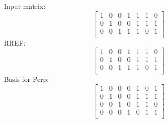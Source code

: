 \noindent Input matrix:
$$
\left[
\begin{array}{*{7}{c}}
1 & 0 & 0 & 1 & 1 & 1 & 0\\
0 & 1 & 0 & 0 & 1 & 1 & 1\\
0 & 0 & 1 & 1 & 1 & 0 & 1\\
\end{array}
\right]
$$
RREF:
$$
\left[
\begin{array}{*{7}{c}}
1 & 0 & 0 & 1 & 1 & 1 & 0\\
0 & 1 & 0 & 0 & 1 & 1 & 1\\
0 & 0 & 1 & 1 & 1 & 0 & 1\\
\end{array}
\right]
$$
Basis for Perp:
$$
\left[
\begin{array}{*{7}{c}}
1 & 0 & 0 & 0 & 1 & 0 & 1\\
0 & 1 & 0 & 0 & 1 & 1 & 1\\
0 & 0 & 1 & 0 & 1 & 1 & 0\\
0 & 0 & 0 & 1 & 0 & 1 & 1\\
\end{array}
\right]
$$
